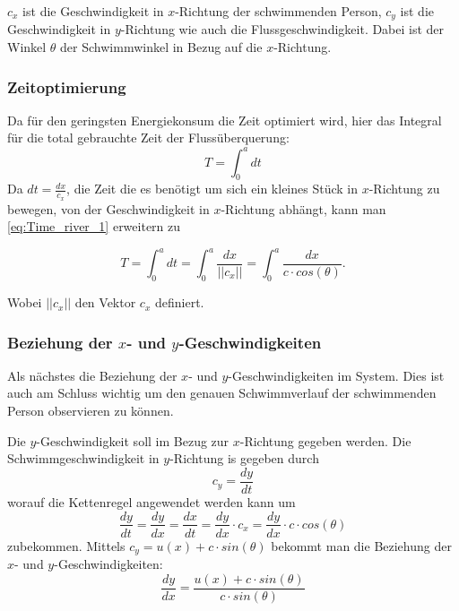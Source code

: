 \(c_x\) ist die Geschwindigkeit in \(x\)-Richtung der schwimmenden Person, \(c_y\) ist die Geschwindigkeit in \(y\)-Richtung wie auch die Flussgeschwindigkeit. Dabei ist der Winkel \(\theta\) der Schwimmwinkel in Bezug auf die \(x\)-Richtung.


\subsubsection{Zeitoptimierung}

Da für den geringsten Energiekonsum die Zeit optimiert wird, hier das Integral für die total gebrauchte Zeit der Flussüberquerung:
\begin{equation}
    T = \int_0^adt \label{eq:Time_river_1}
\end{equation}
Da \(dt = \frac{dx}{c_x}\), die Zeit die es benötigt um sich ein kleines Stück in \(x\)-Richtung zu bewegen, von der Geschwindigkeit in \(x\)-Richtung abhängt, kann man \ref{eq:Time_river_1} erweitern zu

\begin{equation}
    T = \int_0^adt = \int_0^a\frac{dx}{||c_x||} = \int_0^a\frac{dx}{c\cdot cos(\theta)} \label{eq:Time_river_2}.
\end{equation}

Wobei \(||c_x||\) den Vektor \(c_x\) definiert. 


\subsubsection{Beziehung der \(x\)- und \(y\)-Geschwindigkeiten}

Als nächstes die Beziehung der \(x\)- und \(y\)-Geschwindigkeiten im System. Dies ist auch am Schluss wichtig um den genauen Schwimmverlauf der schwimmenden Person observieren zu können.

Die \(y\)-Geschwindigkeit soll im Bezug zur \(x\)-Richtung gegeben werden. Die Schwimmgeschwindigkeit in \(y\)-Richtung is gegeben durch
\begin{equation}
    c_y = \frac{dy}{dt}
\end{equation}
worauf die Kettenregel angewendet werden kann um
\begin{equation}
    \frac{dy}{dt} = \frac{dy}{dx} = \frac{dx}{dt} = \frac{dy}{dx}\cdot c_x = \frac{dy}{dx}\cdot c\cdot cos(\theta)
\end{equation}
zubekommen. Mittels \(c_y = u(x) + c\cdot sin(\theta)\) bekommt man die Beziehung der \(x\)- und \(y\)-Geschwindigkeiten:
\begin{equation}
    \frac{dy}{dx} = \frac{u(x) + c \cdot sin(\theta)}{c \cdot sin(\theta)} \label{eq:dy_dx}
\end{equation}



